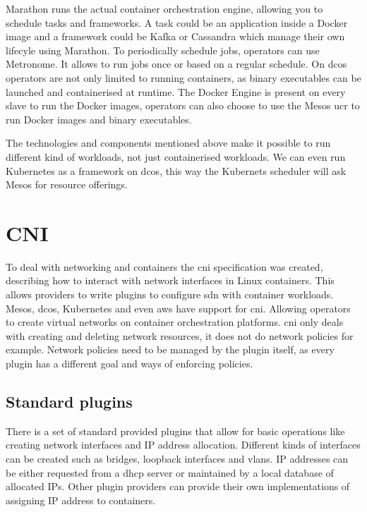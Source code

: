 Marathon\cite{marathon} runs the actual container orchestration engine, allowing you to schedule tasks and frameworks. A task could be an application inside a Docker image and a framework could be Kafka\cite{kafka} or Cassandra\cite{cassandra} which manage their own lifecyle using Marathon. To periodically schedule jobs, operators can use Metronome\cite{metronome}. It allows to run jobs once or based on a regular schedule. On \gls{dcos} operators are not only limited to running containers, as binary executables can be launched and containerised at runtime. The Docker Engine is present on every slave to run the Docker images, operators can also choose to use the Mesos \gls{ucr}\cite{ucr} to run Docker images and binary executables.

The technologies and components mentioned above make it possible to run different kind of workloads, not just containerised workloads. We can even run Kubernetes as a framework on \gls{dcos}, this way the Kubernets scheduler will ask Mesos for resource offerings.

\section{CNI}
\label{sec:cni}
To deal with networking and containers the \gls{cni} specification was created, describing how to interact with network interfaces in Linux containers. This allows providers to write plugins to configure \gls{sdn} with container workloads. Mesos, \gls{dcos}, Kubernetes and even \gls{aws} have support for \gls{cni}. Allowing operators to create virtual networks on container orchestration platforms.
\Gls{cni} only deals with creating and deleting network resources, it does not do network policies for example. Network policies need to be managed by the plugin itself, as every plugin has a different goal and ways of enforcing policies.

\subsection{Standard plugins}
\label{subsec:plugins}
There is a set of standard provided plugins\cite{cni_plugin} that allow for basic operations like creating network interfaces and IP address allocation. Different kinds of interfaces can be created such as bridges, loopback interfaces and \glspl{vlan}. IP addresses can be either requested from a \gls{dhcp} server or maintained by a local database of allocated IPs. Other plugin providers can provide their own implementations of assigning IP address to containers.

